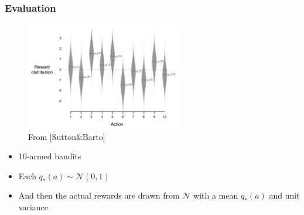 \documentclass[10pt]{beamer}
\theoremstyle{remark}
\begin{document}
\begin{frame}
    \frametitle{Evaluation}
    \begin{figure}
        \centering
        \includegraphics[width=0.6\textwidth]{figures/test_init.png}
        \caption{From [Sutton\&Barto]}
    \end{figure}
    \begin{itemize}
        \item 10-armed bandits
        \item Each $q_{\ast}(a) \sim \mathcal{N}(0, 1)$
        \item And then the actual rewards are drawn from $\mathcal{N}$ with a mean $q_{\ast}(a)$ and unit variance
    \end{itemize}
\end{frame}
\end{document}
